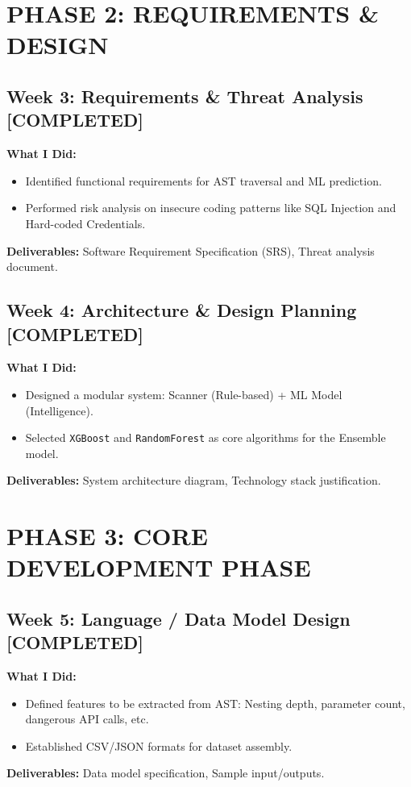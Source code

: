 \documentclass[11pt,a4paper]{article}
\newcommand{\status}[2]{\hfill \textcolor{#1}{\textbf{[#2]}}}
\begin{document}
\section*{PHASE 2: REQUIREMENTS \& DESIGN}

\subsection*{Week 3: Requirements \& Threat Analysis \status{compcolor}{COMPLETED}}
\textbf{What I Did:}
\begin{itemize}[noitemsep]
    \item Identified functional requirements for AST traversal and ML prediction.
    \item Performed risk analysis on insecure coding patterns like SQL Injection and Hard-coded Credentials.
\end{itemize}
\textbf{Deliverables:} Software Requirement Specification (SRS), Threat analysis document.

\subsection*{Week 4: Architecture \& Design Planning \status{compcolor}{COMPLETED}}
\textbf{What I Did:}
\begin{itemize}[noitemsep]
    \item Designed a modular system: Scanner (Rule-based) + ML Model (Intelligence).
    \item Selected \texttt{XGBoost} and \texttt{RandomForest} as core algorithms for the Ensemble model.
\end{itemize}
\textbf{Deliverables:} System architecture diagram, Technology stack justification.

\section*{PHASE 3: CORE DEVELOPMENT PHASE}

\subsection*{Week 5: Language / Data Model Design \status{compcolor}{COMPLETED}}
\textbf{What I Did:}
\begin{itemize}[noitemsep]
    \item Defined features to be extracted from AST: Nesting depth, parameter count, dangerous API calls, etc.
    \item Established CSV/JSON formats for dataset assembly.
\end{itemize}
\textbf{Deliverables:} Data model specification, Sample input/outputs.
\end{document}
